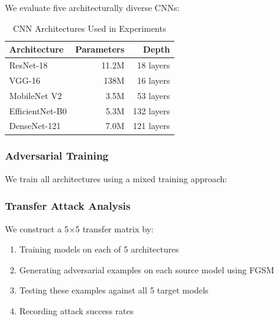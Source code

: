\documentclass[10pt,conference]{IEEEtran}
\begin{document}
We evaluate five architecturally diverse CNNs:

\begin{table}[h]
\centering
\caption{CNN Architectures Used in Experiments}
\begin{tabular}{lrr}
\toprule
\textbf{Architecture} & \textbf{Parameters} & \textbf{Depth} \\
\midrule
ResNet-18 & 11.2M & 18 layers \\
VGG-16 & 138M & 16 layers \\
MobileNet V2 & 3.5M & 53 layers \\
EfficientNet-B0 & 5.3M & 132 layers \\
DenseNet-121 & 7.0M & 121 layers \\
\bottomrule
\end{tabular}
\end{table}

\subsubsection{Adversarial Training}

We train all architectures using a mixed training approach:


\subsubsection{Transfer Attack Analysis}

We construct a 5×5 transfer matrix by:
\begin{enumerate}
    \item Training models on each of 5 architectures
    \item Generating adversarial examples on each source model using FGSM
    \item Testing these examples against all 5 target models
    \item Recording attack success rates
\end{enumerate}
\end{document}
